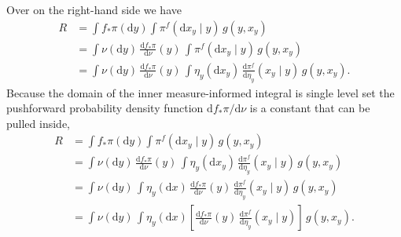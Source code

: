 \documentclass[
  letterpaper,
  DIV=11,
  numbers=noendperiod]{scrartcl}
\begin{document}
Over on the right-hand side we have \begin{align*}
R
&=
\int f_{*} \pi (\mathrm{d} y)
\int \pi^{f}( \mathrm{d}x_{y} \mid y ) \, g(y, x_{y})
\\
&=
\int \nu (\mathrm{d} y) \,
\frac{ \mathrm{d}  f_{*} \pi }{ \mathrm{d}  \nu  }(y) \,
\int \pi^{f}( \mathrm{d}x_{y} \mid y ) \, g(y, x_{y})
\\
&=
\int \nu (\mathrm{d} y) \,
\frac{ \mathrm{d}  f_{*} \pi }{ \mathrm{d}  \nu  }(y) \,
\int \eta_{y} ( \mathrm{d}x_{y} ) \,
\frac{ \mathrm{d} \pi^{f}}{ \mathrm{d} \eta_{y} }(x_{y} \mid y) \, g(y, x_{y}).
\end{align*} Because the domain of the inner measure-informed integral
is single level set the pushforward probability density function
\(\mathrm{d} f_{*} \pi / \mathrm{d} \nu\) is a constant that can be
pulled inside, \begin{align*}
R
&=
\int f_{*} \pi (\mathrm{d} y)
\int \pi^{f}( \mathrm{d}x_{y} \mid y ) \, g(y, x_{y})
\\
&=
\int \nu (\mathrm{d} y) \,
\frac{ \mathrm{d}  f_{*} \pi }{ \mathrm{d}  \nu  }(y) \,
\int \eta_{y} ( \mathrm{d}x_{y} ) \,
\frac{ \mathrm{d} \pi^{f}}{ \mathrm{d} \eta_{y} }(x_{y} \mid y) \, g(y, x_{y})
\\
&=
\int \nu (\mathrm{d} y) \,
\int \eta_{y} ( \mathrm{d}x ) \,
\frac{ \mathrm{d}  f_{*} \pi }{ \mathrm{d}  \nu  }(y) \,
\frac{ \mathrm{d} \pi^{f}}{ \mathrm{d} \eta_{y} }(x_{y} \mid y) \, g(y, x_{y})
\\
&=
\int \nu (\mathrm{d} y) \,
\int \eta_{y} ( \mathrm{d}x )
\left[ \frac{ \mathrm{d}  f_{*} \pi }{ \mathrm{d}  \nu  }(y) \,
       \frac{ \mathrm{d} \pi^{f}}{ \mathrm{d} \eta_{y} }(x_{y} \mid y) \right] \, g(y, x_{y}).
\end{align*}
\end{document}
